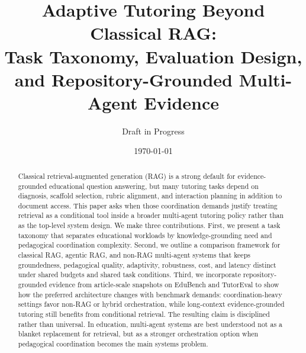 \documentclass[11pt]{article}
\title{Adaptive Tutoring Beyond Classical RAG:\\Task Taxonomy, Evaluation Design, and Repository-Grounded Multi-Agent Evidence}
\author{Draft in Progress}
\date{\today}
\begin{document}
\maketitle

\begin{abstract}
Classical retrieval-augmented generation (RAG) is a strong default for evidence-grounded educational question answering, but many tutoring tasks depend on diagnosis, scaffold selection, rubric alignment, and interaction planning in addition to document access. This paper asks when those coordination demands justify treating retrieval as a conditional tool inside a broader multi-agent tutoring policy rather than as the top-level system design. We make three contributions. First, we present a task taxonomy that separates educational workloads by knowledge-grounding need and pedagogical coordination complexity. Second, we outline a comparison framework for classical RAG, agentic RAG, and non-RAG multi-agent systems that keeps groundedness, pedagogical quality, adaptivity, robustness, cost, and latency distinct under shared budgets and shared task conditions. Third, we incorporate repository-grounded evidence from article-scale snapshots on EduBench and TutorEval to show how the preferred architecture changes with benchmark demands: coordination-heavy settings favor non-RAG or hybrid orchestration, while long-context evidence-grounded tutoring still benefits from conditional retrieval. The resulting claim is disciplined rather than universal. In education, multi-agent systems are best understood not as a blanket replacement for retrieval, but as a stronger orchestration option when pedagogical coordination becomes the main systems problem.
\end{abstract}













\end{document}
